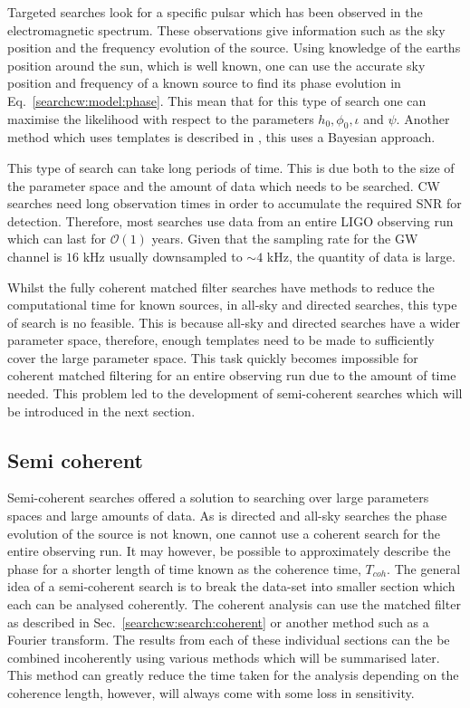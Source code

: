 Targeted searches look for a specific pulsar which has been observed in the electromagnetic spectrum.
These observations give information such as the sky position and the frequency evolution of the source.
Using knowledge of the earths position around the sun, which is well known, one can use the accurate sky position and frequency of a known source to find its phase evolution in Eq.~\ref{searchcw:model:phase}.
This mean that for this type of search one can maximise the likelihood with respect to the parameters  $h_0, \phi_0, \iota$ and $\psi$.
Another method which uses templates is described in \citep{dupuis2005BayesianEstimation}, this uses a Bayesian approach.

This type of search can take long periods of time. 
This is due both to the size of the parameter space and the amount of data which needs to be searched.
\ac{CW} searches need long observation times in order to accumulate the required \ac{SNR} for detection.
Therefore, most searches use data from an entire \ac{LIGO} observing run which can last for $\mathcal{O}(1)$ years.
Given that the sampling rate for the \ac{GW} channel is $16$ kHz usually downsampled to $\sim 4$ kHz, the quantity of data is large. 


Whilst the fully coherent matched filter searches have methods to reduce the computational time for known sources, in all-sky and directed searches, this type of search is no feasible. 
This is because all-sky and directed searches have a wider parameter space, therefore, enough templates need to be made to sufficiently cover the large parameter space. 
This task quickly becomes impossible for coherent matched filtering for an entire observing run due to the amount of time needed. This problem led to the development of semi-coherent searches which will be introduced in the next section. 


\subsection{\label{searchcw:search:semi}Semi coherent}

Semi-coherent searches offered a solution to searching over large parameters spaces and large amounts of data. 
As is directed and all-sky searches the phase evolution of the source is not known, one cannot use a coherent search for the entire observing run.
It may however, be possible to approximately describe the phase for a shorter length of time known as the coherence time, $T_{coh}$.
The general idea of a semi-coherent search is to break the data-set into smaller section which each can be analysed coherently.
The coherent analysis can use the matched filter as described in Sec.~\ref{searchcw:search:coherent} or another method such as a Fourier transform.
The results from each of these individual sections can the be combined incoherently using various methods which will be summarised later. 
This method can greatly reduce the time taken for the analysis depending on the coherence length, however, will always come with some loss in sensitivity. 

